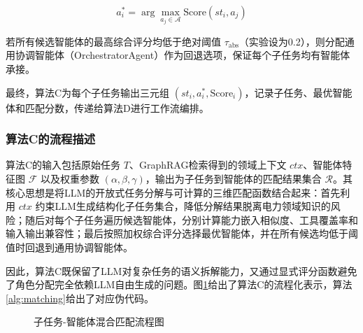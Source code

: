 \begin{equation}
a_i^* = \arg\max_{a_j \in \mathcal{A}} \text{Score}(st_i, a_j)
\end{equation}

若所有候选智能体的最高综合评分均低于绝对阈值 $\tau_{\text{abs}}$（实验设为0.2），则分配通用协调智能体（OrchestratorAgent）作为回退选项，保证每个子任务均有智能体承接。

最终，算法C为每个子任务输出三元组 $(st_i, a_i^*, \text{Score}_i)$，记录子任务、最优智能体和匹配分数，传递给算法D进行工作流编排。

\subsubsection{算法C的流程描述}

算法C的输入包括原始任务 $T$、GraphRAG检索得到的领域上下文 $ctx$、智能体特征图 $\mathcal{F}$ 以及权重参数 $(\alpha,\beta,\gamma)$，输出为子任务到智能体的匹配结果集合 $\mathcal{R}$。其核心思想是将LLM的开放式任务分解与可计算的三维匹配函数结合起来：首先利用 $ctx$ 约束LLM生成结构化子任务集合，降低分解结果脱离电力领域知识的风险；随后对每个子任务遍历候选智能体，分别计算能力嵌入相似度、工具覆盖率和输入输出兼容性；最后按照加权综合评分选择最优智能体，并在所有候选均低于阈值时回退到通用协调智能体。

因此，算法C既保留了LLM对复杂任务的语义拆解能力，又通过显式评分函数避免了角色分配完全依赖LLM自由生成的问题。图\ref{fig:algorithm_c_flow}给出了算法C的流程化表示，算法\ref{alg:matching}给出了对应伪代码。

\begin{figure}[H]
\centering

\caption{子任务-智能体混合匹配流程图}
\label{fig:algorithm_c_flow}
\end{figure}

